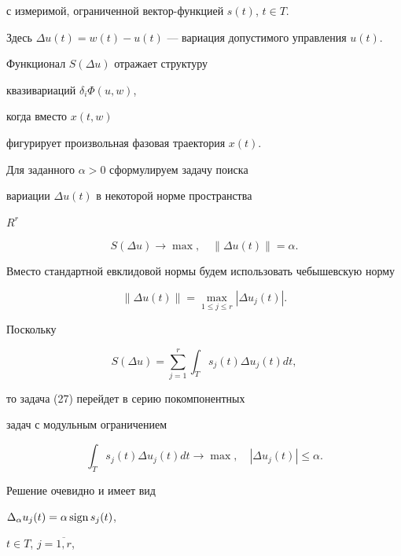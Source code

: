 с измеримой, ограниченной вектор-функцией $s(t)$, $t\in T$.





Здесь $\Delta u(t)=w(t) - u(t)$ --- вариация допустимого управления $u(t)$.


Функционал $S(\Delta u)$ отражает структуру 


квазивариаций $\delta_{i}\Phi (u,w)$, 


когда вместо $x(t,w)$


фигурирует произвольная фазовая траектория $x(t)$.





Для заданного $\alpha>0$ сформулируем задачу поиска 


вариации $\Delta u(t)$ в некоторой норме пространства


$R^{r}$


\begin{equation}


S(\Delta u) \rightarrow \max,\quad \| \Delta u(t) \|=\alpha.


\end{equation}





Вместо стандартной евклидовой нормы будем использовать чебышевскую норму


\begin{equation}


\| \Delta u(t)\|=\max_{1 \leq j \leq r} | \Delta u_{j}(t)|.


\end{equation}


Поскольку


$$


S(\Delta u)=\sum_{j=1}^{r} \int_{T} s_{j}(t) \Delta u_{j}(t)dt,


$$


то задача (27) перейдет в серию покомпонентных 


задач с модульным ограничением


$$


\int_{T} s_{j}(t) \Delta u_{j}(t)dt \rightarrow \max,


\quad |\Delta u_{j} (t)| \leq \alpha.


$$


Решение очевидно и имеет вид


$\Delta_{\alpha} u_{j}(t)=\alpha\operatorname{sign} s_{j}(t)$,


$t\in T$, $j=\overline{1,r}$,


